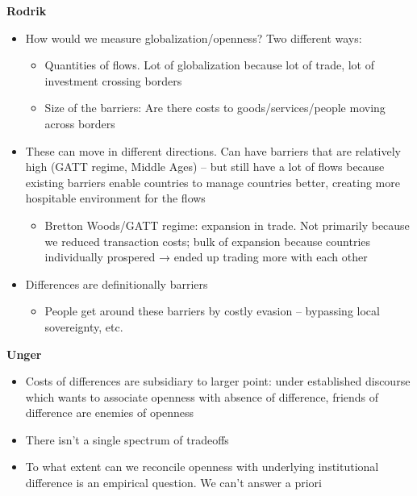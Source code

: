 \textbf{Rodrik}

\begin{itemize}
\tightlist
\item
  How would we measure globalization/openness? Two different ways:

  \begin{itemize}
  \tightlist
  \item
    Quantities of flows. Lot of globalization because lot of trade, lot
    of investment crossing borders
  \item
    Size of the barriers: Are there costs to goods/services/people
    moving across borders
  \end{itemize}
\item
  These can move in different directions. Can have barriers that are
  relatively high (GATT regime, Middle Ages) -- but still have a lot of
  flows because existing barriers enable countries to manage countries
  better, creating more hospitable environment for the flows

  \begin{itemize}
  \tightlist
  \item
    Bretton Woods/GATT regime: expansion in trade. Not primarily because
    we reduced transaction costs; bulk of expansion because countries
    individually prospered → ended up trading more with each other
  \end{itemize}
\item
  Differences are definitionally barriers

  \begin{itemize}
  \tightlist
  \item
    People get around these barriers by costly evasion -- bypassing
    local sovereignty, etc.
  \end{itemize}
\end{itemize}

\textbf{Unger}

\begin{itemize}
\tightlist
\item
  Costs of differences are subsidiary to larger point: under established
  discourse which wants to associate openness with absence of
  difference, friends of difference are enemies of openness
\item
  There isn't a single spectrum of tradeoffs
\item
  To what extent can we reconcile openness with underlying institutional
  difference is an empirical question. We can't answer a priori
\end{itemize}

